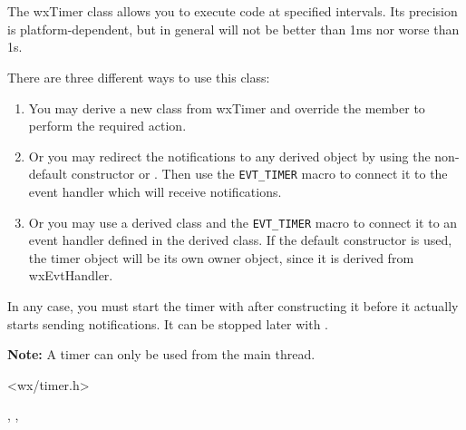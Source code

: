 \section{}\label{wxtimer}

The wxTimer class allows you to execute code at specified intervals. Its
precision is platform-dependent, but in general will not be better than 1ms nor
worse than 1s.

There are three different ways to use this class:

\begin{enumerate}
\item You may derive a new class from wxTimer and override the 
 member to perform the required action.
\item Or you may redirect the notifications to any 
 derived object by using the non-default
constructor or . Then use the {\tt EVT\_TIMER} 
macro to connect it to the event handler which will receive 
 notifications.
\item Or you may use a derived class and the {\tt EVT\_TIMER} 
macro to connect it to an event handler defined in the derived class.
If the default constructor is used, the timer object will be its
own owner object, since it is derived from wxEvtHandler.
\end{enumerate}

In any case, you must start the timer with  
after constructing it before it actually starts sending notifications. It can
be stopped later with .

{\bf Note:} A timer can only be used from the main thread.




<wx/timer.h>


, , 


\label{wxtimerwxtimer}


